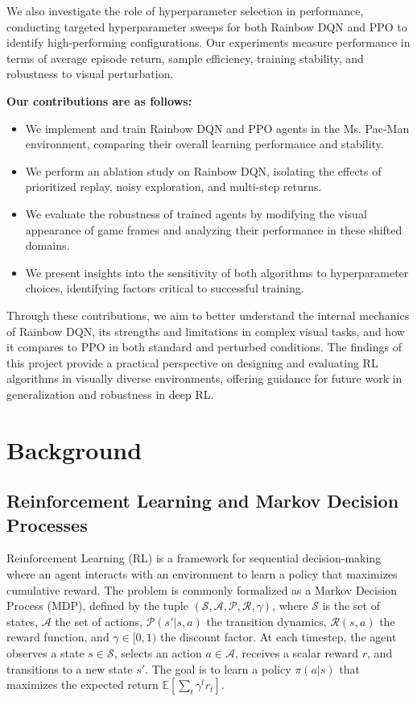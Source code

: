 \documentclass{article}
\begin{document}
We also investigate the role of hyperparameter selection in performance, conducting targeted hyperparameter sweeps for both Rainbow DQN and PPO to identify high-performing configurations. Our experiments measure performance in terms of average episode return, sample efficiency, training stability, and robustness to visual perturbation.

\textbf{Our contributions are as follows:}
\begin{itemize}
    \item We implement and train Rainbow DQN and PPO agents in the Ms. Pac-Man environment, comparing their overall learning performance and stability.
    \item We perform an ablation study on Rainbow DQN, isolating the effects of prioritized replay, noisy exploration, and multi-step returns.
    \item We evaluate the robustness of trained agents by modifying the visual appearance of game frames and analyzing their performance in these shifted domains.
    \item We present insights into the sensitivity of both algorithms to hyperparameter choices, identifying factors critical to successful training.
\end{itemize}

Through these contributions, we aim to better understand the internal mechanics of Rainbow DQN, its strengths and limitations in complex visual tasks, and how it compares to PPO in both standard and perturbed conditions. The findings of this project provide a practical perspective on designing and evaluating RL algorithms in visually diverse environments, offering guidance for future work in generalization and robustness in deep RL.

\section{Background}

\subsection{Reinforcement Learning and Markov Decision Processes}

Reinforcement Learning (RL) is a framework for sequential decision-making where an agent interacts with an environment to learn a policy that maximizes cumulative reward. The problem is commonly formalized as a Markov Decision Process (MDP), defined by the tuple $(\mathcal{S}, \mathcal{A}, \mathcal{P}, \mathcal{R}, \gamma)$, where $\mathcal{S}$ is the set of states, $\mathcal{A}$ the set of actions, $\mathcal{P}(s'|s, a)$ the transition dynamics, $\mathcal{R}(s, a)$ the reward function, and $\gamma \in [0, 1)$ the discount factor. At each timestep, the agent observes a state $s \in \mathcal{S}$, selects an action $a \in \mathcal{A}$, receives a scalar reward $r$, and transitions to a new state $s'$. The goal is to learn a policy $\pi(a|s)$ that maximizes the expected return $\mathbb{E}[\sum_t \gamma^t r_t]$.
\end{document}
